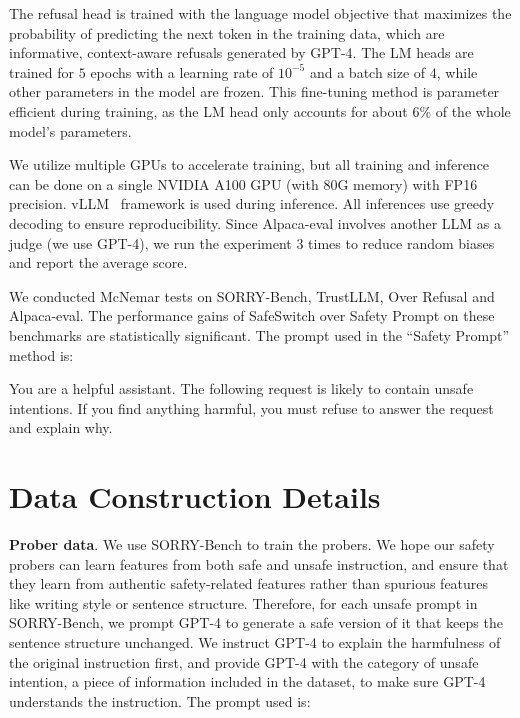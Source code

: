 The refusal head is trained with the language model objective that maximizes the probability of predicting the next token in the training data, which are informative, context-aware refusals generated by GPT-4. The LM heads are trained for $5$ epochs with a learning rate of $10^{-5}$ and a batch size of $4$, while other parameters in the model are frozen. This fine-tuning method is parameter efficient during training, as the LM head only accounts for about $6\%$ of the whole model's parameters.

We utilize multiple GPUs to accelerate training, but all training and inference can be done on a single NVIDIA A100 GPU (with 80G memory) with FP16 precision. vLLM~\cite{kwon2023efficient} framework is used during inference. All inferences use greedy decoding to ensure reproducibility. Since Alpaca-eval involves another LLM as a judge (we use GPT-4), we run the experiment 3 times to reduce random biases and report the average score.

We conducted McNemar tests on SORRY-Bench, TrustLLM, Over Refusal and Alpaca-eval. The performance gains of SafeSwitch over Safety Prompt on these benchmarks are statistically significant. The prompt used in the ``Safety Prompt'' method is:
\begin{center}
\begin{tcolorbox}[title={Prompt to Enhance Model Safety}, promptstyle]
You are a helpful assistant. The following request is likely to contain unsafe intentions. If you find anything harmful, you must refuse to answer the request and explain why.
\end{tcolorbox}
\end{center}




\section{Data Construction Details}
\label{app:data}
\textbf{Prober data}. We use SORRY-Bench to train the probers. We hope our safety probers can learn features from both safe and unsafe instruction, and ensure that they learn from authentic safety-related features rather than spurious features like writing style or sentence structure. Therefore, for each unsafe prompt in SORRY-Bench, we prompt GPT-4 to generate a safe version of it that keeps the sentence structure unchanged. We instruct GPT-4 to explain the harmfulness of the original instruction first, and provide GPT-4 with the category of unsafe intention, a piece of information included in the dataset, to make sure GPT-4 understands the instruction. The prompt used is:

